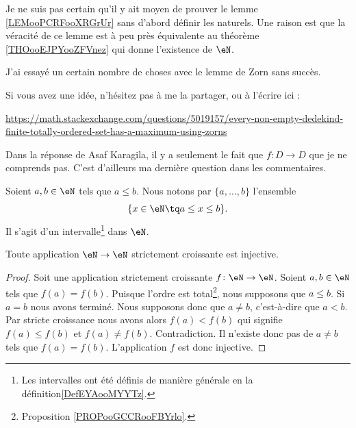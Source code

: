 \begin{probleme}		\label{PROBooUCQFooTugfDl}
	Je ne suis pas certain qu'il y ait moyen de prouver le lemme \ref{LEMooPCRFooXRGrUr} sans d'abord définir les naturels. Une raison est que la véracité de ce lemme est à peu près équivalente au théorème \ref{THOooEJPYooZFVnez} qui donne l'existence de \( \eN\).

	J'ai essayé un certain nombre de choses avec le lemme de Zorn sans succès.

	Si vous avez une idée, n'hésitez pas à me la partager, ou à l'écrire ici :
	\begin{center}
		\url{https://math.stackexchange.com/questions/5019157/every-non-empty-dedekind-finite-totally-ordered-set-has-a-maximum-using-zorns}
	\end{center}

	Dans la réponse de Asaf Karagila, il y a seulement le fait que \(f \colon D\to D  \) que je ne comprends pas. C'est d'ailleurs ma dernière question dans les commentaires.
\end{probleme}


\begin{definition}      \label{DEFooKBUFooLvMHrf}
	Soient \( a,b\in \eN\) tels que \( a\leq b\). Nous notons par \( \{ a,\ldots, b \}\) l'ensemble
	\begin{equation}
		\{ x\in \eN\tq a\leq x\leq b \}.
	\end{equation}
 	Il s'agit d'un intervalle\footnote{Les intervalles ont été définis de manière générale en la définition\ref{DefEYAooMYYTz}.} dans \( \eN \). 
\end{definition}

\begin{proposition}     \label{PROPooFYMJooWihvhk}
	Toute application \( \eN\to \eN\) strictement croissante est injective.
\end{proposition}

\begin{proof}
	Soit une application strictement croissante \( f\colon \eN\to \eN\). Soient \( a,b\in \eN\) tels que \( f(a)=f(b)\). Puisque l'ordre est total\footnote{Proposition \ref{PROPooGCCRooFBYrlo}.}, nous supposons que \( a\leq b\). Si \( a=b\) nous avons terminé. Nous supposons donc que \( a\neq b\), c'est-à-dire que \( a<b\). Par stricte croissance nous avons alors \( f(a)<f(b)\) qui signifie \( f(a)\leq f(b)\) et \( f(a)\neq f(b)\). Contradiction. Il n'existe donc pas de \( a\neq b\) tels que \( f(a)=f(b)\). L'application \( f\) est donc injective.
\end{proof}


